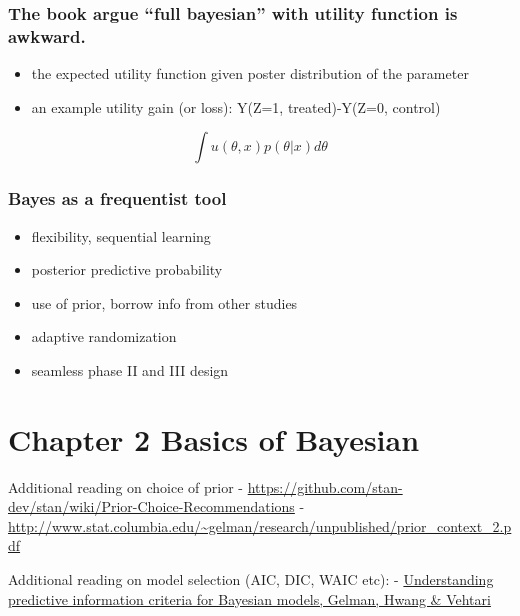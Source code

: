 \documentclass[
]{article}
\providecommand{\tightlist}{%
  \setlength{\itemsep}{0pt}\setlength{\parskip}{0pt}}
\begin{document}
\hypertarget{the-book-argue-full-bayesian-with-utility-function-is-awkward.}{%
\subsubsection{The book argue ``full bayesian'' with utility function is
awkward.}\label{the-book-argue-full-bayesian-with-utility-function-is-awkward.}}

\begin{itemize}
\tightlist
\item
  the expected utility function given poster distribution of the
  parameter
\item
  an example utility gain (or loss): Y(Z=1, treated)-Y(Z=0, control)
\end{itemize}

\[ \int u(\theta, x) p(\theta |x)d\theta \]

\hypertarget{bayes-as-a-frequentist-tool}{%
\subsubsection{Bayes as a frequentist
tool}\label{bayes-as-a-frequentist-tool}}

\begin{itemize}
\tightlist
\item
  flexibility, sequential learning
\item
  posterior predictive probability
\item
  use of prior, borrow info from other studies
\item
  adaptive randomization
\item
  seamless phase II and III design
\end{itemize}

\hypertarget{chapter-2-basics-of-bayesian}{%
\section{Chapter 2 Basics of
Bayesian}\label{chapter-2-basics-of-bayesian}}

Additional reading on choice of prior -
\url{https://github.com/stan-dev/stan/wiki/Prior-Choice-Recommendations}
-
\url{http://www.stat.columbia.edu/~gelman/research/unpublished/prior_context_2.pdf}

Additional reading on model selection (AIC, DIC, WAIC etc): -
\href{http://www.stat.columbia.edu/~gelman/research/published/waic_understand3.pdf}{Understanding
predictive information criteria for Bayesian models, Gelman, Hwang \&
Vehtari}
\end{document}
